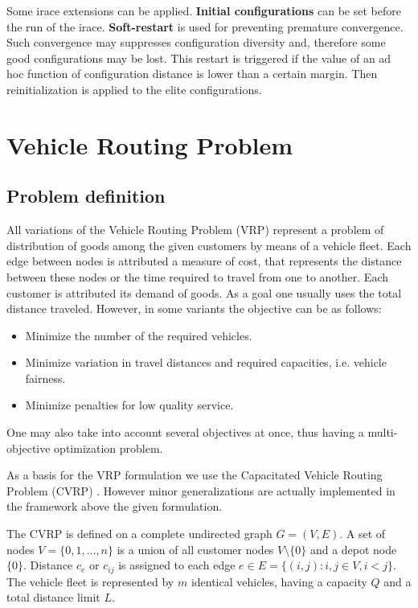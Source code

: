 \documentclass[11pt,a4paper,oneside]{book}
\begin{document}
Some irace extensions can be applied. \textbf{Initial configurations} can be set before the run of the irace. \textbf{Soft-restart} is used for preventing premature convergence. Such convergence may suppresses configuration diversity and, therefore some good configurations may be lost. This restart is triggered if the value of an ad hoc function of configuration distance is lower than a certain margin. Then reinitialization is applied to the elite configurations.


\chapter{Vehicle Routing Problem}


\section{Problem definition}

All variations of the Vehicle Routing Problem (VRP) represent a problem of distribution of goods among the given customers by means of a vehicle fleet. Each edge between nodes is attributed a measure of cost, that represents the distance between these nodes or the time required to travel from one to another. Each customer is attributed its demand of goods. As a goal one usually uses the total distance traveled. However, in some variants the objective can be as follows:

\begin{itemize}
\item Minimize the number of the required vehicles.
\item Minimize variation in travel distances and required capacities, i.e. vehicle fairness.
\item Minimize penalties for low quality service.
\end{itemize}

One may also take into account several objectives at once, thus having a multi-objective optimization problem.

As a basis for the VRP formulation we use the Capacitated Vehicle Routing Problem (CVRP) \cite{CORDEAU2007367}. However minor generalizations are actually implemented in the framework above the given formulation. \par

The CVRP is defined on a complete undirected graph $G=(V,E)$. A set of nodes $V=\{0,1,...,n\}$ is a union of all customer nodes $V\setminus\{0\}$ and a depot node $\{0\}$. Distance $c_e$ or $c_{ij}$ is assigned to each edge $e \in E = \{(i,j): i,j \in V, i<j\}$. The vehicle fleet is represented by $m$ identical vehicles, having a capacity $Q$ and a total distance limit $L$.
\end{document}
